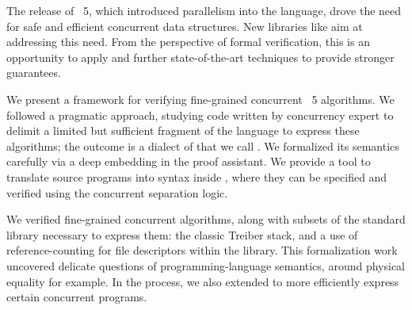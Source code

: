 The release of \OCaml~5, which introduced parallelism into the language, drove the need for safe and efficient concurrent data structures.
New libraries like \Saturn%
aim at addressing this need.
From the perspective of formal verification, this is an opportunity to apply and further state-of-the-art techniques to provide stronger guarantees.

We present a framework for verifying fine-grained concurrent \OCaml~5 algorithms.
We followed a pragmatic approach, studying \OCaml code written by concurrency expert to delimit a limited but sufficient fragment of the language to express these algorithms; the outcome is a dialect of \OCaml that we call \ZooLang.
We formalized its semantics carefully via a deep embedding in the \Rocq proof assistant.
We provide a tool to translate source \OCaml programs into \ZooLang syntax inside \Rocq, where they can be specified and verified using the \Iris%
concurrent separation logic.

We verified fine-grained concurrent algorithms, along with subsets of the \OCaml standard library necessary to express them: the classic Treiber stack, and a use of reference-counting for file descriptors within the \Eio library.
This formalization work uncovered delicate questions of programming-language semantics, around physical equality for example.
In the process, we also extended \OCaml to more efficiently express certain concurrent programs.
